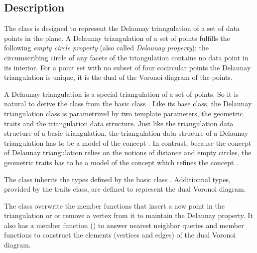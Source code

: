 \subsection{Description}
\label{Subsection_2D_Triangulations_Delaunay_Description}
The class  is designed to represent
the Delaunay triangulation of a set of data points in the plane.
A  Delaunay triangulation of a set of points
fulfills
the following {\em empty circle property} 
(also called {\em Delaunay property}): the circumscribing
circle of any facets of the triangulation 
contains no data point in its interior.
For a point set with no subset of four cocircular points
the Delaunay triangulation is unique, it is  the dual
of the Voronoi diagram of the points.


A Delaunay triangulation is a special triangulation of a set of points.
So it is natural to derive  
the class 
from the basic class .
Like its base class, the Delaunay triangulation class is parametrized
by  two template 
parameters,  the geometric traits 
and the triangulation data structure.
Just like the triangulation  data structure
of a basic triangulation,
the triangulation data strucure  of a Delaunay triangulation
has to be a   model of the concept .
In contrast, because the
concept of Delaunay triangulation relies on the notions of
distance and  
empty circles, 
the geometric traits has to be a model of the concept
which refines the concept .




The class 
inherits the types defined by the 
basic class .
Additionnal types, provided by the traits class,
are defined to represent the dual Voronoi diagram.


The class 
overwrite the member functions that insert a new point
in the triangulation or
or remove a vertex  from it
to maintain the Delaunay property.
It also has a member function ()
to answer nearest neighbor queries
and member functions to construct the elements (vertices and edges)
of the dual Voronoi diagram.

